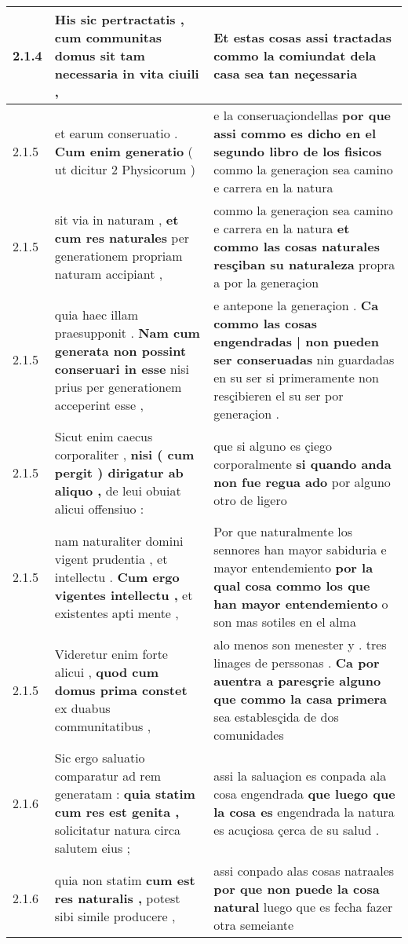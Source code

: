 \begin{tabular}{|p{1cm}|p{6.5cm}|p{6.5cm}|}
2.1.4 & His sic pertractatis , \textbf{ cum communitas domus sit } tam necessaria in vita ciuili , & Et estas cosas assi tractadas \textbf{ commo la comiundat dela casa } sea tan neçessaria \\\hline
2.1.5 & et earum conseruatio . \textbf{ Cum enim generatio } ( ut dicitur 2 Physicorum ) & e la conseruaçiondellas \textbf{ por que assi commo es dicho en el segundo libro de los fisicos } commo la generaçion sea camino e carrera en la natura \\\hline
2.1.5 & sit via in naturam , \textbf{ et cum res naturales } per generationem propriam naturam accipiant , & commo la generaçion sea camino e carrera en la natura \textbf{ et commo las cosas naturales resçiban su naturaleza } propra a por la generaçion \\\hline
2.1.5 & quia haec illam praesupponit . \textbf{ Nam cum generata non possint conseruari in esse } nisi prius per generationem acceperint esse , & e antepone la generaçion . \textbf{ Ca commo las cosas engendradas | non pueden ser conseruadas } nin guardadas en su ser si primeramente non resçibieren el su ser por generaçion . \\\hline
2.1.5 & Sicut enim caecus corporaliter , \textbf{ nisi ( cum pergit ) dirigatur ab aliquo , } de leui obuiat alicui offensiuo : & que si alguno es çiego corporalmente \textbf{ si quando anda non fue regua ado } por alguno otro de ligero \\\hline
2.1.5 & nam naturaliter domini vigent prudentia , et intellectu . \textbf{ Cum ergo vigentes intellectu , } et existentes apti mente , & Por que naturalmente los sennores han mayor sabiduria e mayor entendemiento \textbf{ por la qual cosa commo los que han mayor entendemiento } o son mas sotiles en el alma \\\hline
2.1.5 & Videretur enim forte alicui , \textbf{ quod cum domus prima constet } ex duabus communitatibus , & alo menos son menester y . tres linages de perssonas . \textbf{ Ca por auentra a paresçrie alguno que commo la casa primera } sea establesçida de dos comunidades \\\hline
2.1.6 & Sic ergo saluatio comparatur ad rem generatam : \textbf{ quia statim cum res est genita , } solicitatur natura circa salutem eius ; & assi la saluaçion es conpada ala cosa engendrada \textbf{ que luego que la cosa es } engendrada la natura es acuçiosa çerca de su salud . \\\hline
2.1.6 & quia non statim \textbf{ cum est res naturalis , } potest sibi simile producere , & assi conpado alas cosas natraales \textbf{ por que non puede la cosa natural } luego que es fecha fazer otra semeiante \\\hline

\end{tabular}
